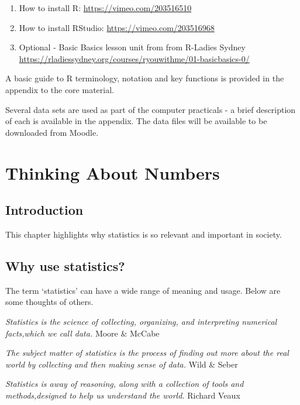 \documentclass[
  oneside]{krantz}
\providecommand{\tightlist}{%
  \setlength{\itemsep}{0pt}\setlength{\parskip}{0pt}}
\begin{document}
\begin{enumerate}
\def\labelenumi{\arabic{enumi})}
\tightlist
\item
  How to install R: \url{https://vimeo.com/203516510}
\item
  How to install RStudio: \url{https://vimeo.com/203516968}
\item
  Optional - Basic Basics lesson unit from from R-Ladies Sydney \url{https://rladiessydney.org/courses/ryouwithme/01-basicbasics-0/}
\end{enumerate}

A basic guide to R terminology, notation and key functions is provided in the appendix to the core material.

Several data sets are used as part of the computer practicals - a brief description of each is available in the appendix. The data files will be available to be downloaded from Moodle.

\hypertarget{introchapt}{%
\chapter{Thinking About Numbers}\label{introchapt}}

\hypertarget{INTintro}{%
\section{Introduction}\label{INTintro}}

This chapter highlights why statistics is so relevant and important in society.

\hypertarget{why-use-statistics}{%
\section{Why use statistics?}\label{why-use-statistics}}

The term `statistics' can have a wide range of meaning and usage. Below are some thoughts of others.

\emph{Statistics is the science of collecting, organizing, and interpreting numerical facts,which we call data.}
Moore \& McCabe\citeyearpar{moore1993}

\emph{The subject matter of statistics is the process of finding out more about the real world by collecting and then making sense of data.}
Wild \& Seber \citeyearpar{wildgaf}

\emph{Statistics is away of reasoning, along with a collection of tools and methods,designed to help us understand the world.}
Richard Veaux \citeyearpar{richard2006veaux}
\end{document}
